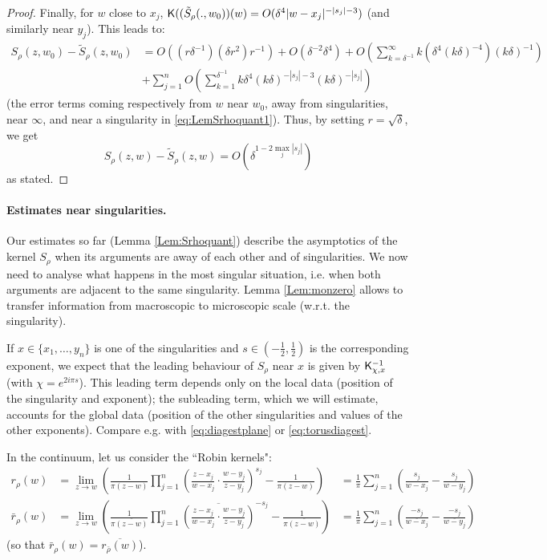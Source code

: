 \documentclass[10pt]{article}
\newcommand{\rK}{{\sf K}}
\begin{document}
\begin{proof}
Finally, for $w$ close to $x_j$,
$\rK((\tilde S_\rho(.,w_0))(w)=O(\delta^4|w-x_j|^{-|s_j|-3})$ (and similarly near $y_j$). This leads to:
\begin{align*}
S_\rho(z,w_0)-\tilde S_\rho(z,w_0)&=O((r\delta^{-1})(\delta r^2)r^{-1})+O(\delta^{-2}\delta^4)+O(\sum_{k=\delta^{-1}}^\infty k(\delta^4(k\delta)^{-4})(k\delta)^{-1})\\
&+\sum_{j=1}^nO(\sum_{k=1}^{\delta^{-1}} k\delta^4(k\delta)^{-|s_j|-3}(k\delta)^{-|s_j|})
\end{align*}
(the error terms coming respectively from $w$ near $w_0$, away from singularities, near $\infty$, and near a singularity in \eqref{eq:LemSrhoquant1}). Thus, by setting $r=\sqrt\delta$, we get
$$S_\rho(z,w)-\tilde S_\rho(z,w)=O(\delta^{1-2\max_j |s_j|})$$
as stated.
\end{proof}


\paragraph{Estimates near singularities.\\}

Our estimates so far (Lemma \ref{Lem:Srhoquant}) describe the asymptotics of the kernel $S_\rho$ when its arguments are away of each other and of singularities. We now need to analyse what happens in the most singular situation, i.e. when both arguments are adjacent to the same singularity. Lemma \ref{Lem:monzero} allows to transfer information from macroscopic to microscopic scale (w.r.t. the singularity).

If $x\in\{x_1,\dots,y_n\}$ is one of the singularities and $s\in(-\frac 12,\frac 12)$ is the corresponding exponent, we expect that the leading behaviour of $S_\rho$ near $x$ is given by $\rK^{-1}_{\chi,x}$ (with $\chi=e^{2i\pi s}$). This leading term depends only on the local data (position of the singularity and exponent); the subleading term, which we will estimate, accounts for the global data (position of the other singularities and values of the other exponents). Compare e.g. with \eqref{eq:diagestplane} or \eqref{eq:torusdiagest}.

%

In the continuum, let us consider the ``Robin kernels":
\begin{align*}
r_\rho(w)&=\lim_{z\rightarrow w}\left(\frac{1}{\pi(z-w)}\prod_{j=1}^n\left(\frac{z-x_j}{w-x_j}\cdot\frac{w-y_j}{z-y_j}\right)^{s_j}-\frac{1}{\pi(z-w)}\right)&=\frac 1\pi\sum_{j=1}^n\left(\frac{s_j}{w-x_j}-\frac{s_j}{w-y_j}\right)\\
\bar r_\rho(w)&=
\lim_{z\rightarrow w}\left(\frac{1}{\pi\overline{(z-w)}}\prod_{j=1}^n\overline{\left(\frac{z-x_j}{w-x_j}\cdot\frac{w-y_j}{z-y_j}\right)}^{-s_j}-\frac{1}{\pi\overline{(z-w)}}\right)
&=\frac 1\pi\sum_{j=1}^n\left(\frac{-s_j}{\overline{w-x_j}}-\frac{-s_j}{\overline{w-y_j}}\right)
\end{align*}
(so that $\bar r_\rho(w)=\overline{ r_{\bar\rho}(w)}$).
\end{document}

